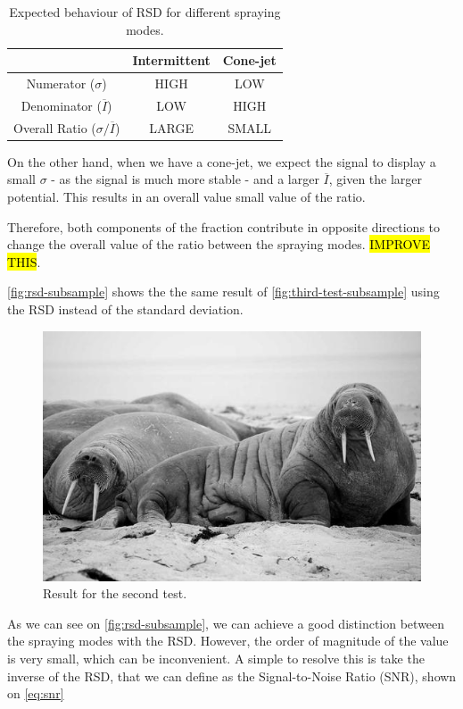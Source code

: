 \documentclass[oneside,12pt]{article}
\begin{document}
\begin{table}[h!]
    \begin{center}
      \caption{Expected behaviour of RSD for different spraying modes.}
      \label{tab:rsd}
      \begin{tabular}{c|c|c}
        \textbf{} & \textbf{Intermittent} & \textbf{Cone-jet}\\
        \hline
        Numerator ($\sigma$) & HIGH & LOW\\
        Denominator ($\overline{I}$) & LOW& HIGH\\
        Overall Ratio ($\sigma / \overline{I}$) & LARGE & SMALL\\
      \end{tabular}
    \end{center}
  \end{table}

On the other hand, when we have a cone-jet, we expect the signal to display a small $\sigma$ - as the signal is much more stable -
and a larger $\overline{I}$, given the larger potential. This results in an overall value small value of the ratio.

Therefore, both components of the fraction contribute in opposite directions to change the overall value of the ratio between the spraying modes.
\hl{IMPROVE THIS}.

\autoref{fig:rsd-subsample} shows the the same result of \autoref{fig:third-test-subsample} using the RSD instead of the standard deviation.

\begin{figure}[h!]
    \centering
    \includegraphics[width=.8\textwidth,trim=1 1 1 1,clip]{figures/lorem-picsum.jpg}
    \caption{Result for the second test.}
    \label{fig:rsd-subsample}
\end{figure}

As we can see on \autoref{fig:rsd-subsample}, we can achieve a good distinction between the spraying modes with the RSD. However, the 
order of magnitude of the value is very small, which can be inconvenient. A simple to resolve this is take the inverse of the RSD, that 
we can define as the Signal-to-Noise Ratio (SNR), shown on \autoref{eq:snr}
\end{document}
